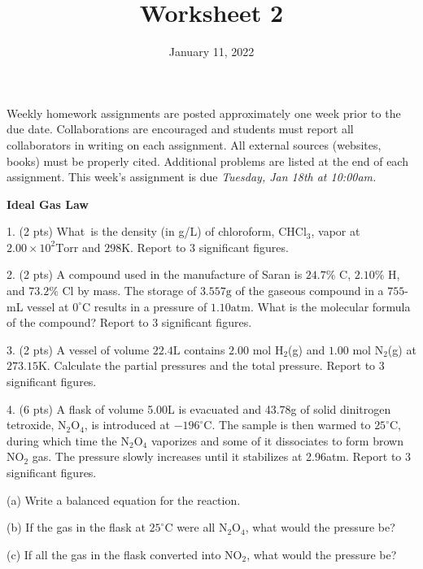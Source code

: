 \documentclass[11pt]{article}
\title{\textbf{Worksheet 2}}
\date{\vspace{-2em}January 11, 2022}
\begin{document}
\maketitle

Weekly homework assignments are posted approximately one week prior to the
due date. Collaborations are encouraged and students must report all collaborators
in writing on each assignment. All external sources (websites, books) must be
properly cited. Additional problems are listed at the end of each assignment.
This week's assignment is due \textit{Tuesday, Jan 18th at 10:00am.}

\textbf{Ideal Gas Law}

1. (2 pts) What\ is the density (in g/L) of chloroform, CHCl$_3$, vapor at
$2.00\times 10^2\text{Torr}$ and $298\text{K}$. Report to 3 significant figures.

\vspace{1.5in}

2. (2 pts) A compound used in the manufacture of Saran is $24.7\%$ C, $2.10\%$ H, and
$73.2\%$ Cl by mass. The storage of $3.557\text{g}$ of the gaseous compound in
a $755$-mL vessel at $0^\circ\text{C}$ results in a pressure of $1.10\text{atm}$.
What is the molecular formula of the compound? Report to 3 significant figures.


\vspace{1.5in}

3. (2 pts) A vessel of volume $22.4\text{L}$ contains $2.00$ mol H$_2$(g) and $1.00$ mol
N$_2$(g) at $273.15\text{K}$. Calculate the partial pressures and the total pressure.
Report to 3 significant figures.

\vspace{1.7in}

4. (6 pts) A flask of volume 5.00L is evacuated and 43.78g of solid dinitrogen tetroxide,
N$_2$O$_4$, is introduced at $-196^\circ\text{C}$. The sample is then warmed to
$25^\circ\text{C}$, during which time the N$_2$O$_4$ vaporizes and some of it dissociates
to form brown NO$_2$ gas. The pressure slowly increases until it stabilizes at 2.96atm.
Report to 3 significant figures.

(a) Write a balanced equation for the reaction.

(b) If the gas in the flask at $25^\circ\text{C}$ were all N$_2$O$_4$, what would the pressure
be?

(c) If all the gas in the flask converted into NO$_2$, what would the pressure be?
\end{document}
